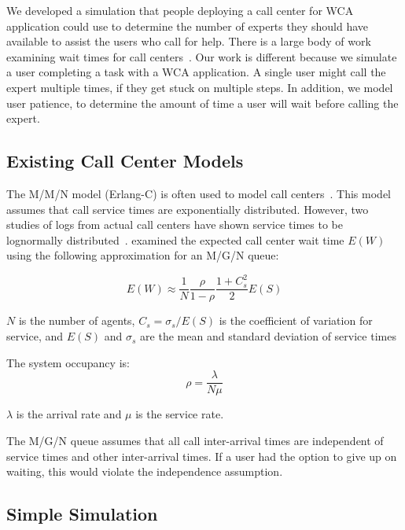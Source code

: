 We developed a simulation that people deploying a call center for WCA
application could use to determine the number of experts they should have
available to assist the users who call for help.
There is a large body of work examining wait times for call
centers~\cite{queue1, queue2}.
Our work is different because we simulate a user completing a task with a WCA
application.
A single user might call the expert multiple times, if they get stuck on
multiple steps.
In addition, we model user patience, to determine the amount of time a user will
wait before calling the expert.

\subsection{Existing Call Center Models}

The M/M/N model (Erlang-C) is often used to model call centers~\cite{queue1}.
This model assumes that call service times are exponentially distributed.
However, two studies of logs from actual call centers have shown service times
to be lognormally distributed~\cite{queue1, queue2}.
\citet{queue1} examined the expected call center wait time $E(W)$ using the
following approximation for an M/G/N queue:

\begin{equation}
  E(W) \approx \frac{1}{N} \frac{\rho}{1 - \rho} \frac{1 + C_s^2}{2} E(S)
\label{eq:wait}
\end{equation}

$N$ is the number of agents,
$C_s = \sigma_s / E(S)$ is the coefficient of variation for service, and
$E(S)$ and $\sigma_s$ are the mean and standard deviation of service times

The system occupancy is:
\begin{equation}
\rho = \frac{\lambda}{N \mu}
\label{eq:occupancy}
\end{equation}

$\lambda$ is the arrival rate and $\mu$ is the service rate.

The M/G/N queue assumes that all call inter-arrival times are independent of
service times and other inter-arrival times.
If a user had the option to give up on waiting, this would violate the
independence assumption.

\subsection{Simple Simulation}

